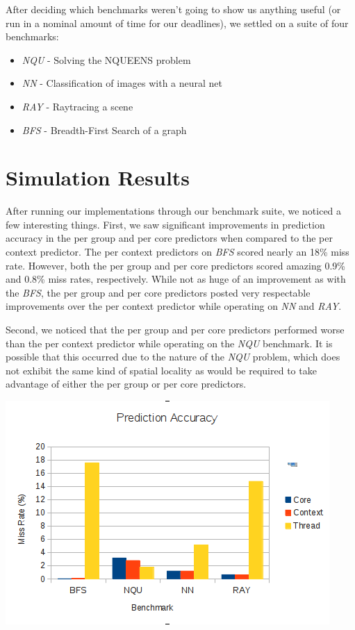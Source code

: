 \documentclass[conference]{IEEEtran}
\begin{document}
After deciding which benchmarks weren't going to show us anything useful (or run in a nominal amount of time for our deadlines), we settled on a suite of four benchmarks:

\begin{itemize}
	\item \emph{NQU} - Solving the NQUEENS problem
	\item \emph{NN} - Classification of images with a neural net
	\item \emph{RAY} - Raytracing a scene
	\item \emph{BFS} - Breadth-First Search of a graph
\end{itemize}

\section{Simulation Results}

After running our implementations through our benchmark suite, we noticed a few interesting things.  First, we saw significant improvements in prediction accuracy in the per group and per core predictors when compared to the per context predictor.  The per context predictors on \emph{BFS} scored nearly an 18\% miss rate.  However, both the per group and per core predictors scored amazing 0.9\% and 0.8\% miss rates, respectively.  While not as huge of an improvement as with the \emph{BFS}, the per group and per core predictors posted very respectable improvements over the per context predictor while operating on \emph{NN} and \emph{RAY}.

Second, we noticed that the per group and per core predictors performed worse than the per context predictor while operating on the \emph{NQU} benchmark.  It is possible that this occurred due to the nature of the \emph{NQU} problem, which does not exhibit the same kind of spatial locality as would be required to take advantage of either the per group or per core predictors.

\begin{center}
	\includegraphics[width=.45\textwidth]{data.png}
\end{center}
\end{document}
